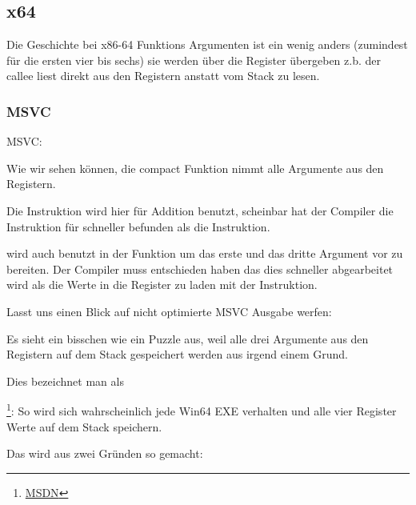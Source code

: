 \subsection{x64}


Die Geschichte bei x86-64 Funktions Argumenten ist ein wenig anders (zumindest für die ersten vier bis sechs)
sie werden über die Register übergeben z.b. der \gls{callee} liest direkt aus den Registern anstatt vom Stack 
zu lesen.

\subsubsection{MSVC}

\Optimizing MSVC:



Wie wir sehen können, die compact Funktion \ttf nimmt alle Argumente aus den Registern.

Die \LEA Instruktion wird hier für Addition benutzt,
scheinbar hat der Compiler die Instruktion für schneller befunden als
die  Instruktion.


\LEA wird auch benutzt in der \main Funktion um das erste und das dritte \ttf Argument vor zu bereiten.
Der Compiler muss entschieden haben das dies schneller abgearbeitet wird als die Werte in die Register 
zu laden mit der \MOV Instruktion.

Lasst uns einen Blick auf nicht optimierte MSVC Ausgabe werfen:



Es sieht ein bisschen wie ein Puzzle aus, weil alle drei Argumente aus den Registern auf dem Stack
gespeichert werden aus irgend einem Grund.

\label{shadow_space}
Dies bezeichnet man als 

\footnote{\href{http://msdn.microsoft.com/en-us/library/zthk2dkh(v=vs.80).aspx}{MSDN}}: 
So wird sich wahrscheinlich jede Win64 EXE verhalten und alle vier Register Werte auf dem Stack speichern.

Das wird aus zwei Gründen so gemacht:

